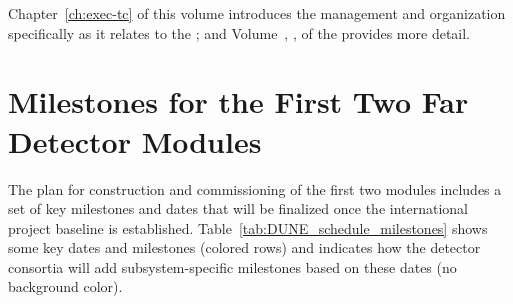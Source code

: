 Chapter~\ref{ch:exec-tc} of this volume %
introduces the  management and organization specifically as it relates to the ; and Volume~\volnumbertc{}, \voltitletc{}, of the  provides more detail.

\section{Milestones for the First Two Far Detector Modules} 

The plan for construction and commissioning of the first two  modules includes a set of key milestones and dates 
that will be finalized once the international project baseline is established.  Table~\ref{tab:DUNE_schedule_milestones} shows some key dates and milestones (colored rows) and indicates how the detector consortia will add subsystem-specific milestones based on these dates (no background color).
 
